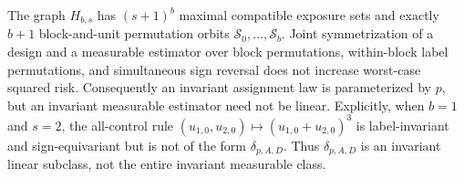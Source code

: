 The graph \(H_{b,s}\) has \((s+1)^b\) maximal compatible exposure sets and exactly \(b+1\) block-and-unit permutation orbits \(\mathcal S_0,\ldots,\mathcal S_b\). Joint symmetrization of a design and a measurable estimator over block permutations, within-block label permutations, and simultaneous sign reversal does not increase worst-case squared risk. Consequently an invariant assignment law is parameterized by \(p\), but an invariant measurable estimator need not be linear. Explicitly, when \(b=1\) and \(s=2\), the all-control rule \((u_{1,0},u_{2,0})\mapsto(u_{1,0}+u_{2,0})^3\) is label-invariant and sign-equivariant but is not of the form \(\delta_{p,A,D}\). Thus \(\delta_{p,A,D}\) is an invariant linear subclass, not the entire invariant measurable class.
